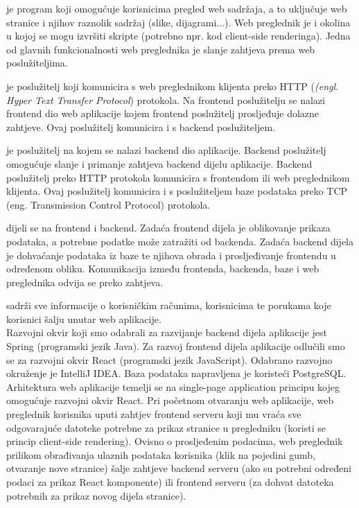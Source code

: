 		  je program koji omogućuje korisnicima pregled web sadržaja, a to uključuje web stranice i njihov raznolik sadržaj (slike, dijagrami...). Web preglednik je i okolina u kojoj se mogu izvršiti skripte (potrebno npr. kod client-side renderinga). Jedna od glavnih funkcionalnosti web preglednika je slanje zahtjeva prema web poslužiteljima.
		 	
		  je poslužitelj koji komunicira s web preglednikom klijenta preko HTTP (\textit{(engl. Hyper Text Transfer Protocol}) protokola. Na frontend poslužitelju se nalazi frontend dio web aplikacije kojem frontend poslužitelj prosljeđuje dolazne zahtjeve. Ovaj poslužitelj komunicira i s backend poslužiteljem.
		 
		  je poslužitelj na kojem se nalazi backend dio aplikacije. Backend poslužitelj omogućuje slanje i primanje zahtjeva backend dijelu aplikacije. Backend poslužitelj preko HTTP protokola komunicira s frontendom ili web preglednikom klijenta. Ovaj poslužitelj komunicira i s poslužiteljem baze podataka preko TCP (eng. Transmission Control Protocol) protokola.
		 
		  dijeli se na frontend i backend. Zadaća frontend dijela je oblikovanje prikaza podataka, a potrebne podatke može zatražiti od backenda. Zadaća backend dijela je dohvaćanje podataka iz baze te njihova obrada i prosljeđivanje frontendu u određenom obliku. Komunikacija između frontenda, backenda, baze i web preglednika odvija se preko zahtjeva.
		 
		  sadrži sve informacije o korisničkim računima, korisnicima te porukama koje korisnici šalju unutar web aplikacije.\\
		 	
		 Razvojni okvir koji smo odabrali za razvijanje backend dijela aplikacije jest Spring (programski jezik Java). Za razvoj frontend dijela aplikacije odlučili smo se za razvojni okvir React (programski jezik JavaScript). Odabrano razvojno okruženje je IntelliJ IDEA. Baza podataka napravljena je koristeći PostgreSQL.\\
		 
		 Arhitektura web aplikacije temelji se na single-page application principu kojeg omogućuje razvojni okvir React. Pri početnom otvaranju web aplikacije, web preglednik korisnika uputi zahtjev frontend serveru koji mu vraća sve odgovarajuće datoteke potrebne za prikaz stranice u pregledniku (koristi se princip client-side rendering). Ovisno o prosljeđenim podacima, web preglednik prilikom obrađivanja ulaznih podataka korisnika (klik na pojedini gumb, otvaranje nove stranice) šalje zahtjeve backend serveru (ako su potrebni određeni podaci za prikaz React komponente) ili frontend serveru (za dohvat datoteka potrebnih za prikaz novog dijela stranice).
		 
